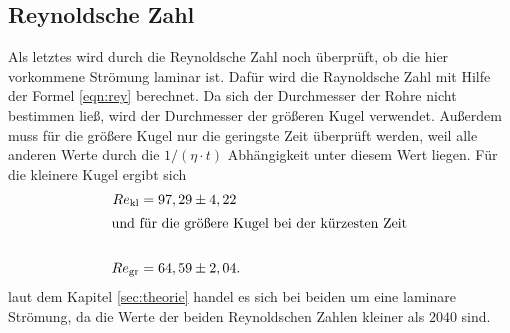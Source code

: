 \subsection{Reynoldsche Zahl}
\label{sec:rey}
Als letztes wird durch die Reynoldsche Zahl noch überprüft,
ob die hier vorkommene Strömung laminar ist.
Dafür wird die Raynoldsche Zahl mit Hilfe der Formel \eqref{eqn:rey} berechnet.
Da sich der Durchmesser der Rohre nicht bestimmen ließ, wird der Durchmesser
der größeren Kugel verwendet. Außerdem muss für die größere Kugel
nur die geringste Zeit überprüft werden, weil alle
anderen Werte durch die $1/(\eta\cdot t)$ Abhängigkeit unter diesem Wert liegen.
Für die kleinere Kugel ergibt sich
\begin{align*}
Re_{\mathrm{kl}}&=97,29\pm4,22\\
\intertext{und für die größere Kugel bei der kürzesten Zeit}\\
Re_{\mathrm{gr}}&=64,59\pm2,04 .
\end{align*}
laut dem Kapitel \ref{sec:theorie} handel es sich bei beiden
um eine laminare Strömung, da die Werte der beiden Reynoldschen Zahlen kleiner als $2040$ sind.
